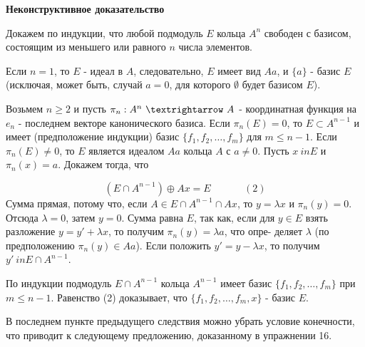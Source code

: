	\noindent
	{\bf Неконструктивное доказательство}
	
	Докажем по индукции, что любой подмодуль $E$ кольца $A^{n}$ свободен\linebreak
	с базисом, состоящим из меньшего или равного $n$ числа элементов.
	
	Если $n = 1$, то $E$ - идеал в $A$, следовательно, $E$ имеет вид $Aa$, и\linebreak
	$\{a\}$ - базис $E$ (исключая, может быть, случай $a = 0$, для которого $\emptyset$\linebreak
	будет базисом $E$).
	
	Возьмем $n\geqslant 2$ и пусть $\pi_{n}:A^{n} \ \textrightarrow \ A$ - координатная функция\linebreak
	на $e_n$ - последнем векторе канонического базиса. Если $\pi_{n}(E) = 0$, то\linebreak
	$E\subset A^{n - 1}$ и  имеет (предположение индукции) базис $\{f_1, f_2, \ldots, f_m\}$ для\linebreak
	$m\leqslant n - 1$. Если $\pi_{n}(E) \neq 0$, то $E$ является идеалом $Aa$ кольца $A$ с $a \neq 0$.\linebreak
	Пусть $x \ in E$ и $\pi_{n}(x) = a$. Докажем тогда, что
	
	$$(E \cap A^{n - 1}) \oplus Ax = E \ \ \ \ \ \ \ \ \ \ \ \ \ \ \ (2)$$
	Сумма прямая, потому что, если $A \in E \cap A^{n - 1} \cap Ax$, то $y = \lambda x$ и\linebreak
	$\pi_{n}(y) = 0$. Отсюда $\lambda = 0$, затем $y = 0$. Сумма равна $E$, так как, если для\linebreak
	$y \in E$ взять разложение $y = y' + \lambda x$, то получим $\pi_{n}(y) = \lambda a$, что опре-\linebreak
	деляет $\lambda$ (по предположению $\pi_{n}(y) \in Aa$). Если положить $y' = y - \lambda x$,\linebreak
	то получим $y' \ in E \cap A^{n - 1}$.
	
	По индукции подмодуль $E \cap A^{n - 1}$ кольца $A^{n - 1}$ имеет базис\linebreak
	$\{f_1, f_2, \ldots, f_m\}$ при $m \leqslant n - 1$. Равенство (2) доказывает, что\linebreak
	$\{f_1, f_2, \ldots, f_m, x\}$ - базис $E$.
	
	В последнем пункте предыдущего следствия можно убрать условие\linebreak
	конечности, что приводит к следующему предложению, доказанному в\linebreak
	упражнении 16.
	
